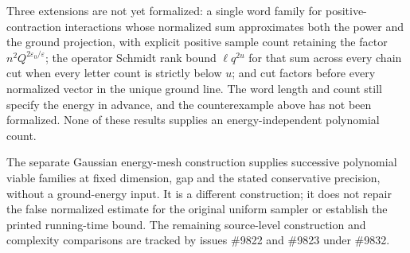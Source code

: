 \documentclass{article}
\begin{document}
Three extensions are not yet formalized: a single word family for
positive-contraction interactions whose normalized sum approximates both the
power and the ground projection, with explicit positive sample count retaining
the factor $n^2Q^{2\varepsilon_0/\varepsilon}$; the operator Schmidt rank
bound $\ell q^{2u}$ for that sum across every chain cut when every letter count
is strictly below $u$; and cut factors before every normalized vector in the
unique ground line. The word length and count still specify the energy in
advance, and the counterexample above has not been formalized. None of these
results supplies an energy-independent polynomial count.

The separate Gaussian energy-mesh construction supplies successive
polynomial viable families at fixed dimension, gap and the stated conservative
precision, without a ground-energy input. It is a different construction;
it does not repair the false normalized estimate for the original uniform
sampler or establish the printed running-time bound. The remaining
source-level construction and complexity comparisons are tracked by
issues \#9822 and \#9823 under \#9832.



\end{document}
